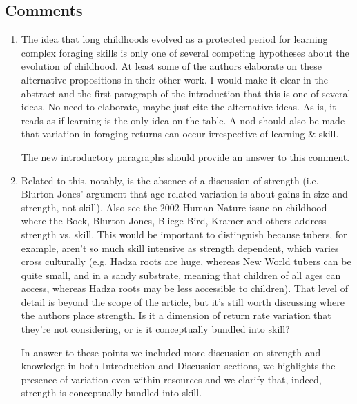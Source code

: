 \documentclass{article}
\newcommand{\rev}[1]{{\color{ForestGreen}#1}}
\begin{document}
\subsection{Comments}
\begin{enumerate}
    \item The idea that long childhoods evolved as a protected period for learning complex foraging skills is only one of several competing hypotheses about the evolution of childhood. At least some of the authors elaborate on these alternative propositions in their other work. I would make it clear in the abstract and the first paragraph of the introduction that this is one of several ideas. No need to elaborate, maybe just cite the alternative ideas. As is, it reads as if learning is the only idea on the table. A nod should also be made that variation in foraging returns can occur irrespective of learning \& skill.
    
    \rev{The new introductory paragraphs should provide an answer to this comment.}
    
    \item Related to this, notably, is the absence of a discussion of strength (i.e. Blurton Jones’ argument that age-related variation is about gains in size and strength, not skill). Also see the 2002 Human Nature issue on childhood where the Bock, Blurton Jones, Bliege Bird, Kramer and others address strength vs. skill. This would be important to distinguish because tubers, for example, aren’t so much skill intensive as strength dependent, which varies cross culturally (e.g. Hadza roots are huge, whereas New World tubers can be quite small, and in a sandy substrate, meaning that children of all ages can access, whereas Hadza roots may be less accessible to children). That level of detail is beyond the scope of the article, but it’s still worth discussing where the authors place strength. Is it a dimension of return rate variation that they’re not considering, or is it conceptually bundled into skill?
    
    \rev{In answer to these points we included more discussion on strength and knowledge in both Introduction and Discussion sections, we highlights the presence of variation even within resources and we clarify that, indeed, strength is conceptually bundled into skill. }
    

\end{enumerate}
\end{document}
